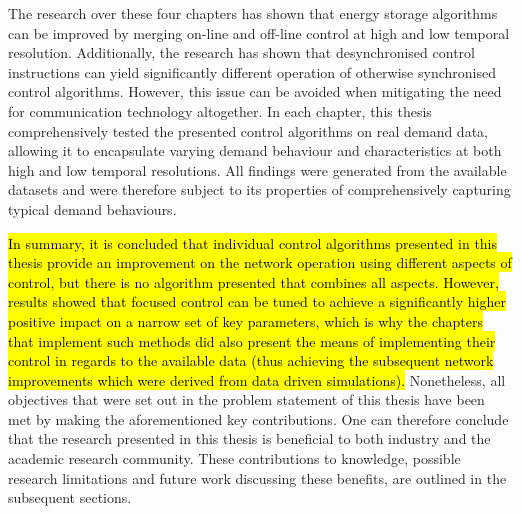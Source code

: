 The research over these four chapters has shown that energy storage algorithms can be improved by merging on-line and off-line control at high and low temporal resolution.
Additionally, the research has shown that desynchronised control instructions can yield significantly different operation of otherwise synchronised control algorithms.
However, this issue can be avoided when mitigating the need for communication technology altogether.
In each chapter, this thesis comprehensively tested the presented control algorithms on real demand data, allowing it to encapsulate varying demand behaviour and characteristics at both high and low temporal resolutions.
All findings were generated from the available datasets and were therefore subject to its properties of comprehensively capturing typical demand behaviours.

\hl{In summary, it is concluded that individual control algorithms presented in this thesis provide an improvement on the network operation using different aspects of control, but there is no algorithm presented that combines all aspects.
However, results showed that focused control can be tuned to achieve a significantly higher positive impact on a narrow set of key parameters, which is why the chapters that implement such methods did also present the means of implementing their control in regards to the available data (thus achieving the subsequent network improvements which were derived from data driven simulations).}
Nonetheless, all objectives that were set out in the problem statement of this thesis have been met by making the aforementioned key contributions.
One can therefore conclude that the research presented in this thesis is beneficial to both industry and the academic research community.
These contributions to knowledge, possible research limitations and future work discussing these benefits, are outlined in the subsequent sections.
